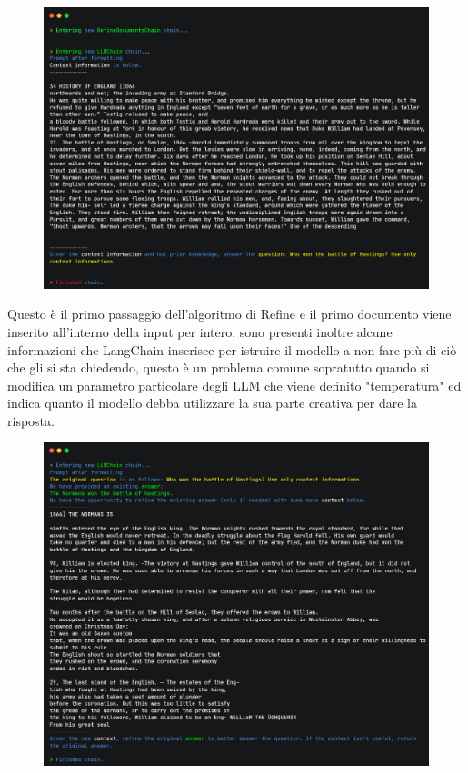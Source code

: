 \begin{figure}[H]
    \includegraphics[width=0.7\pdfpagewidth]{images/refine_step_1.png}
\end{figure}
Questo è il primo passaggio dell'algoritmo di Refine e il primo documento viene inserito all'interno della input per intero, sono presenti inoltre alcune informazioni che LangChain inserisce per istruire il modello a non fare più di ciò che gli si sta chiedendo, questo è un problema comune sopratutto quando si modifica un parametro particolare degli LLM che viene definito "temperatura" ed indica quanto il modello debba utilizzare la sua parte creativa per dare la risposta.


\begin{figure}[H]
    \includegraphics[width=0.7\pdfpagewidth]{images/refine_step_2.png}
\end{figure}

